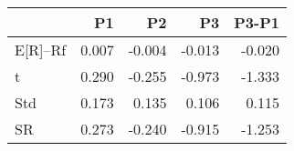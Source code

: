 \begin{tabular}{lrrrr}
\toprule
 & P1 & P2 & P3 & P3-P1 \\
\midrule
E[R]--Rf & 0.007 & -0.004 & -0.013 & -0.020 \\
t & 0.290 & -0.255 & -0.973 & -1.333 \\
Std & 0.173 & 0.135 & 0.106 & 0.115 \\
SR & 0.273 & -0.240 & -0.915 & -1.253 \\
\bottomrule
\end{tabular}
